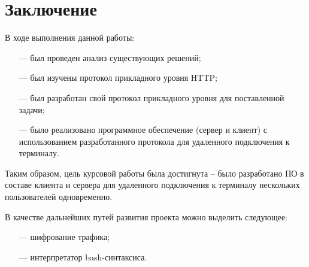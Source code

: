 \chapter*{Заключение}


В ходе выполнения данной работы:

\begin{itemize}
	\item[---] был проведен анализ существующих решений;
	\item[---] был изучены протокол прикладного уровня HTTP;
	\item[---] был разработан свой протокол прикладного уровня для поставленной задачи;
	\item[---] было реализовано программное обеспечение (сервер и клиент) с использованием разработанного протокола для удаленного подключения к терминалу.
\end{itemize}

Таким образом, цель курсовой работы была достигнута -- было разработано ПО в составе клиента и сервера для удаленного подключения к терминалу нескольких пользователей одновременно.

В качестве дальнейших путей развития проекта можно выделить следующее: 
\begin{itemize}
	\item[---] шифрование трафика;
	\item[---] интерпретатор bash-синтаксиса.
\end{itemize}

